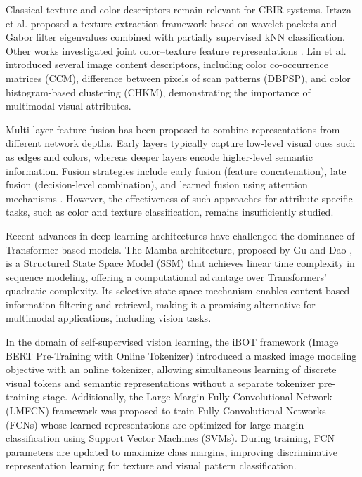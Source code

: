 \documentclass[conference]{IEEEtran}
\begin{document}
Classical texture and color descriptors remain relevant for CBIR systems. Irtaza et al. \cite{b13} proposed a texture extraction framework based on wavelet packets and Gabor filter eigenvalues combined with partially supervised kNN classification. Other works investigated joint color–texture feature representations \cite{b14}. Lin et al. \cite{b15} introduced several image content descriptors, including color co-occurrence matrices (CCM), difference between pixels of scan patterns (DBPSP), and color histogram-based clustering (CHKM), demonstrating the importance of multimodal visual attributes.

Multi-layer feature fusion has been proposed to combine representations from different network depths. Early layers typically capture low-level visual cues such as edges and colors, whereas deeper layers encode higher-level semantic information. Fusion strategies include early fusion (feature concatenation), late fusion (decision-level combination), and learned fusion using attention mechanisms \cite{b26,b27}. However, the effectiveness of such approaches for attribute-specific tasks, such as color and texture classification, remains insufficiently studied.

Recent advances in deep learning architectures have challenged the dominance of Transformer-based models. The Mamba architecture, proposed by Gu and Dao \cite{b16}, is a Structured State Space Model (SSM) that achieves linear time complexity in sequence modeling, offering a computational advantage over Transformers’ quadratic complexity. Its selective state-space mechanism enables content-based information filtering and retrieval, making it a promising alternative for multimodal applications, including vision tasks.

In the domain of self-supervised vision learning, the iBOT framework (Image BERT Pre-Training with Online Tokenizer) \cite{b17} introduced a masked image modeling objective with an online tokenizer, allowing simultaneous learning of discrete visual tokens and semantic representations without a separate tokenizer pre-training stage. Additionally, the Large Margin Fully Convolutional Network (LMFCN) framework was proposed to train Fully Convolutional Networks (FCNs) whose learned representations are optimized for large-margin classification using Support Vector Machines (SVMs). During training, FCN parameters are updated to maximize class margins, improving discriminative representation learning for texture and visual pattern classification.
\end{document}
